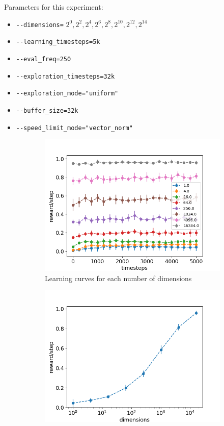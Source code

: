 \documentclass{article}
\begin{document}
Parameters for this experiment:
\begin{itemize}
    \item[] \lstinline|--dimensions=| $2^0, 2^2, 2^4, 2^6, 2^8, 2^{10}, 2^{12}, 2^{14}$
    \item[] \lstinline|--learning_timesteps=5k|
    \item[] \lstinline|--eval_freq=250|
    \item[] \lstinline|--exploration_timesteps=32k|
    \item[] \lstinline|--exploration_mode="uniform"|
    \item[] \lstinline|--buffer_size=32k|
    \item[] \lstinline|--speed_limit_mode="vector_norm"|
\end{itemize}

\begin{figure}[H]
  \centering
  \begin{subfigure}[b]{0.45\linewidth}
    \includegraphics[width=\linewidth]{Study_3/half_norm/scores_dimensions.png}
      \caption{Learning curves for each number of dimensions}
  \end{subfigure}
  \begin{subfigure}[b]{0.45\linewidth}
    \includegraphics[width=\linewidth]{Study_3/half_norm/total_scores.png}

\end{subfigure}
\end{figure}
\end{document}
